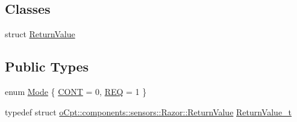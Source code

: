 \subsection*{Classes}
\begin{DoxyCompactItemize}
\item 
struct \hyperlink{structo_cpt_1_1components_1_1sensors_1_1_razor_1_1_return_value}{Return\+Value}
\end{DoxyCompactItemize}
\subsection*{Public Types}
\begin{DoxyCompactItemize}
\item 
enum \hyperlink{classo_cpt_1_1components_1_1sensors_1_1_razor_afed258e485aaaf9193a57d649ccb159b}{Mode} \{ \hyperlink{classo_cpt_1_1components_1_1sensors_1_1_razor_afed258e485aaaf9193a57d649ccb159ba512aed2858fbf6bf5c12ea88da01d5e2}{C\+O\+NT} = 0, 
\hyperlink{classo_cpt_1_1components_1_1sensors_1_1_razor_afed258e485aaaf9193a57d649ccb159ba44c61c0088038c1222adbddd1664555b}{R\+EQ} = 1
 \}
\item 
typedef struct \hyperlink{structo_cpt_1_1components_1_1sensors_1_1_razor_1_1_return_value}{o\+Cpt\+::components\+::sensors\+::\+Razor\+::\+Return\+Value} \hyperlink{classo_cpt_1_1components_1_1sensors_1_1_razor_aab55c5b1a96ce97421e4696599549954}{Return\+Value\+\_\+t}
\end{DoxyCompactItemize}
